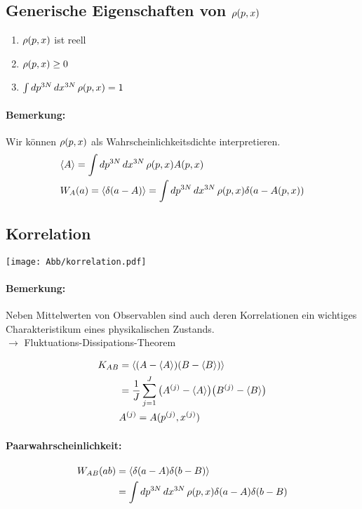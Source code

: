 	\subsection{Generische Eigenschaften von $\rho ( p , x )$}

\begin{enumerate}
	\item $\rho ( p , x )$ ist reell\\
	\item $\rho ( p , x ) \geq 0$\\
	\item $\int dp^{3N} \, dx^{3N} \, \rho ( p , x ) = 1$
\end{enumerate}
\paragraph{Bemerkung:} Wir können $\rho ( p , x )$ als Wahrscheinlichkeitsdichte
interpretieren.
\begin{align*}
	&\erw{A} = \dpdx \rhopx A(p,x)\\
	&\wkeit{A} = \erw{\deltaa} = \dpdx \rhopx \delta ( a - A(p,x) )
\end{align*}

	\subsection{Korrelation}

\begin{center}
	\texttt{[image: Abb/korrelation.pdf]}
\end{center}

\paragraph{Bemerkung:} Neben Mittelwerten von Observablen sind auch deren
Korrelationen ein wichtiges Charakteristikum eines physikalischen Zustands.\\
$\rightarrow$ Fluktuations-Dissipations-Theorem

\begin{align*}
	K_{AB} &= \langle ( A - \langle A \rangle ) ( B - \langle B \rangle ) \rangle\\
		   &= \frac{1}{J} \sum_{j=1}^{J} \big( A^{(j)} - \langle A \rangle \big) \big( 
		      B^{(j)} - \langle B \rangle \big)\\
		   & A^{(j)} = A(p^{(j)}, x^{(j)})
\end{align*}

\paragraph{Paarwahrscheinlichkeit:} 
\begin{align*}
	\wkeit{AB} &= \erw{ \deltaa \deltab }\\
				   &= \dpdx \rhopx \deltaa \deltab
\end{align*}

